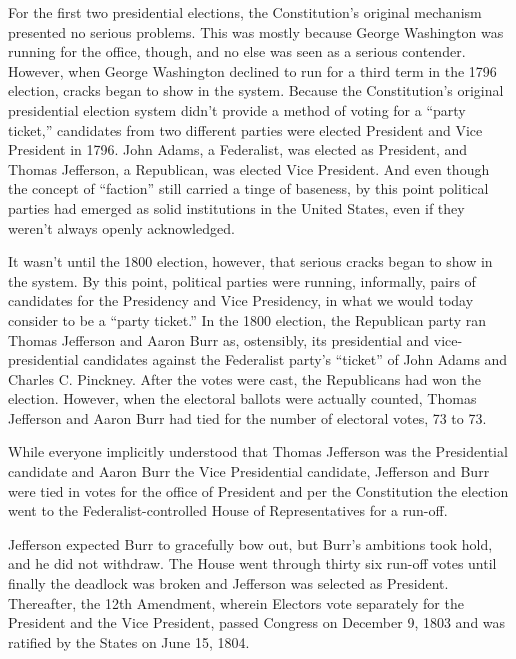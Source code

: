 For the first two presidential elections, the Constitution's original mechanism presented no serious problems.  This was mostly because George Washington was running for the office, though, and no else was seen as a serious contender.  However, when George Washington declined to run for a third term in the 1796 election, cracks began to show in the system.   Because the Constitution's original presidential election system didn't provide a method of voting for a ``party ticket,'' candidates from two different parties were elected President and Vice President in 1796.  John Adams, a Federalist, was elected as President, and Thomas Jefferson, a Republican, was elected Vice President.  And even though the concept of ``faction'' still carried a tinge of baseness, by this point political parties had emerged as solid institutions in the United States, even if they weren't always openly acknowledged.

It wasn't until the 1800 election, however, that serious cracks began to show in the system.  By this point, political parties were running, informally, pairs of candidates for the Presidency and Vice Presidency, in what we would today consider to be a ``party ticket.''  In the 1800 election, the Republican party ran Thomas Jefferson and Aaron Burr as, ostensibly, its presidential and vice-presidential candidates against the Federalist party's ``ticket'' of John Adams and Charles C. Pinckney.  After the votes were cast, the Republicans had won the election.  However, when the electoral ballots were actually counted, Thomas Jefferson and Aaron Burr had tied for the number of electoral votes, 73 to 73.

While everyone implicitly understood that Thomas Jefferson was the Presidential candidate and Aaron Burr the Vice Presidential candidate, Jefferson and Burr were tied in votes for the office of President and per the Constitution the election went to the Federalist-controlled House of Representatives for a run-off.

Jefferson expected Burr to gracefully bow out, but Burr's ambitions took hold, and he did not withdraw.
The House went through thirty six run-off votes until finally the deadlock was broken and Jefferson was selected as President.
Thereafter, the 12th Amendment, wherein Electors vote separately for the President and the Vice President, passed Congress on December 9, 1803 and was ratified by the States on June 15, 1804.

